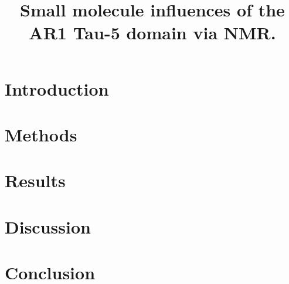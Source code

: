 \documentclass{article}
\title{Small molecule influences of the AR1 Tau-5 domain via NMR.}
\begin{document}
\section{Introduction}


\section{Methods}


\section{Results}


\section{Discussion}


\section{Conclusion}

\end{document}
